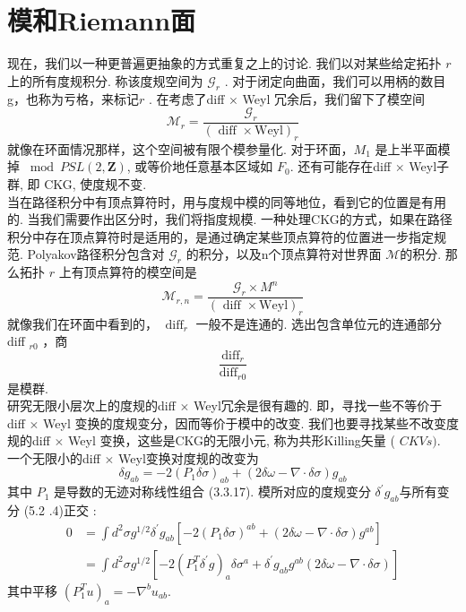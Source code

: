 \section{模和Riemann面}%

现在，我们以一种更普遍更抽象的方式重复之上的讨论. 我们以对某些给定拓扑 $r$上的所有度规积分. 称该度规空间为 $\mathscr{G}_{r} $ . 对于闭定向曲面，我们可以用柄的数目g，也称为亏格，来标记$r$ . 在考虑了diff $\times$ Weyl 冗余后，我们留下了模空间
\begin{equation}
	\mathscr{M}_{r}=\frac{\mathscr{G}_{r}}{(\text { diff } \times \mathrm{Weyl})_{r}}
\end{equation}
就像在环面情况那样，这个空间被有限个模参量化. 对于环面，$M_{1}$ 是上半平面模掉 $\bmod P S L(2, \mathbf{Z})$, 或等价地任意基本区域如 $F_{0}$. 还有可能存在diff $\times$ Weyl子群, 即 CKG, 使度规不变.\\
当在路径积分中有顶点算符时，用与度规中模的同等地位，看到它的位置是有用的. 当我们需要作出区分时，我们将指度规模. 一种处理CKG的方式，如果在路径积分中存在顶点算符时是适用的，是通过确定某些顶点算符的位置进一步指定规范. Polyakov路径积分包含对 $\mathscr{G}_{r}$ 的积分，以及n个顶点算符对世界面 $\mathscr{M} $的积分. 那么拓扑 $r$ 上有顶点算符的模空间是
\begin{equation}
	\mathscr{M}_{r, n}=\frac{\mathscr{G}_{r} \times M^{n}}{(\text { diff } \times \mathrm{Weyl})_{r}}
\end{equation}
就像我们在环面中看到的， $\operatorname{diff}_{r}$ 一般不是连通的. 选出包含单位元的连通部分 diff $_{r 0}$ ，商
\begin{equation}
	\frac{\operatorname{diff}_{r}}{\operatorname{diff}_{r 0}}
\end{equation}
是模群.\\
研究无限小层次上的度规的diff $\times$ Weyl冗余是很有趣的. 即，寻找一些不等价于diff $\times$ Weyl 变换的度规变分，因而等价于模中的改变. 我们也要寻找某些不改变度规的diff $\times$ Weyl 变换，这些是CKG的无限小元, 称为共形Killing矢量 ( $C K V s)$. \\
一个无限小的diff $\times$ Weyl变换对度规的改变为
\begin{equation}
	\delta g_{a b}=-2\left(P_{1} \delta \sigma\right)_{a b}+(2 \delta \omega-\nabla \cdot \delta \sigma) g_{a b}
\end{equation}
其中 $P_{1}$ 是导数的无迹对称线性组合 (3.3.17). 模所对应的度规变分 $\delta^{\prime} g_{a b}$与所有变分 (5.2 .4)正交 :
\begin{equation}
	\begin{aligned}
		0 &=\int d^{2} \sigma g^{1 / 2} \delta^{\prime} g_{a b}\left[-2\left(P_{1} \delta \sigma\right)^{a b}+(2 \delta \omega-\nabla \cdot \delta \sigma) g^{a b}\right] \\
		&=\int d^{2} \sigma g^{1 / 2}\left[-2\left(P_{1}^{T} \delta^{\prime} g\right)_{a} \delta \sigma^{a}+\delta^{\prime} g_{a b} g^{a b}(2 \delta \omega-\nabla \cdot \delta \sigma)\right]
	\end{aligned}
\end{equation}
其中平移 $\left(P_{1}^{T} u\right)_{a}=-\nabla^{b} u_{a b}$. \\

